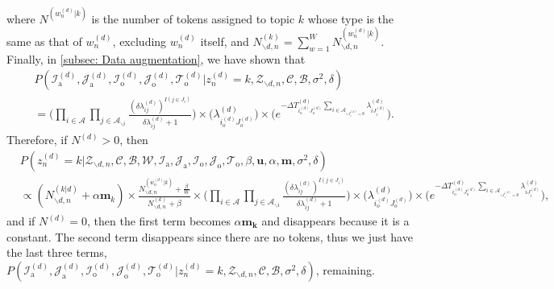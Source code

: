 \documentclass[a4paper]{article}
\begin{document}
 where $N^{(w_n^{(d)}|k)}$ is the number of tokens assigned to topic $k$ whose type is the same as that of $w_n^{(d)}$, excluding $w_n^{(d)}$ itself, and $N^{(k)}_{\backslash d, n}=\sum_{w=1}^W N_{\backslash d, n}^{(w_n^{(d)}|k)}$. Finally, in \ref{subsec: Data augmentation}, we have shown that
 \begin{equation}
 \begin{aligned}
& P(\mathcal{I}^{(d)}_{\mbox{a}}, \mathcal{J}^{(d)}_{\mbox{a}}, \mathcal{I}^{(d)}_{\mbox{o}}, \mathcal{J}^{(d)}_{\mbox{o}}, \mathcal{T}^{(d)}_{\mbox{o}}| z^{(d)}_n=k, \mathcal{Z}_{\backslash d, n}, \mathcal{C}, \mathcal{B}, \sigma^2, \delta)\\&=\Big(\prod_{i\in \mathcal{A}}\prod_{j \in \mathcal{A}_{\backslash i }} \frac{(\delta\lambda^{(d)}_{ij})^{I(j \in J_i)}}{\delta\lambda^{(d)}_{ij}+1}\Big)\times \Big(\lambda^{(d)}_{i_o^{(d)}J_{o}^{(d)}}\Big)\times  \Big(e^{-\Delta T^{(d)}_{i_o^{(d)}J_o^{(d)}}\sum\limits_{i\in \mathcal{A}_{\backslash J^{(d)}_i = \emptyset}}\lambda^{(d)}_{iJ^{(d)}_{i}}}\Big).
 \end{aligned}
 \end{equation}
 Therefore, if $N^{(d)} > 0$, then
 \begin{equation}
 \begin{aligned}
  &P(z^{(d)}_n=k|\mathcal{Z}_{\backslash d, n},   \mathcal{C},   \mathcal{B},\mathcal{W}, \mathcal{I}_{\mbox{a}}, \mathcal{J}_{\mbox{a}}, \mathcal{I}_{\mbox{o}}, \mathcal{J}_{\mbox{o}}, \mathcal{T}_{\mbox{o}}, \beta, \boldsymbol{u}, \alpha, \boldsymbol{m}, \sigma^2, \delta)\\&\propto (N^{(k|d)}_{\backslash d, n}+\alpha \boldsymbol{m}_k)\times \frac{N^{(w_n^{(d)}|k)}_{\backslash d, n}+\frac{\beta}{W} }{N^{(k)}_{\backslash d, n}+\beta}\times\Big(\prod_{i\in \mathcal{A}}\prod_{j \in \mathcal{A}_{\backslash i }} \frac{(\delta\lambda^{(d)}_{ij})^{I(j \in J_i)}}{\delta\lambda^{(d)}_{ij}+1}\Big)\times \Big(\lambda^{(d)}_{i_o^{(d)}J_{o}^{(d)}}\Big)\times  \Big(e^{-\Delta T^{(d)}_{i_o^{(d)}J_o^{(d)}}\sum\limits_{i\in \mathcal{A}_{\backslash J^{(d)}_i = \emptyset}}\lambda^{(d)}_{iJ^{(d)}_{i}}}\Big), 
 \end{aligned}
 \end{equation}
 and if $N^{(d)} = 0$, then the first term becomes $\alpha\boldsymbol{m_k}$ and disappears because it is a constant. The second term disappears since there are no tokens, thus we just have the last three terms, $P(\mathcal{I}^{(d)}_{\mbox{a}}, \mathcal{J}^{(d)}_{\mbox{a}},  \mathcal{I}^{(d)}_{\mbox{o}}, \mathcal{J}^{(d)}_{\mbox{o}}, \mathcal{T}^{(d)}_{\mbox{o}}| z^{(d)}_n=k, \mathcal{Z}_{\backslash d, n}, \mathcal{C}, \mathcal{B}, \sigma^2, \delta)$, remaining.
\end{document}
